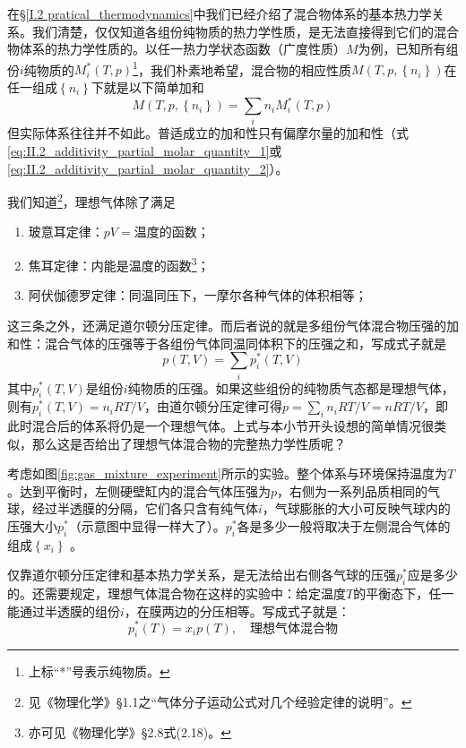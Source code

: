 \documentclass[main.tex]{subfiles}
\begin{document}
在\S\ref{I.2 pratical_thermodynamics}中我们已经介绍了混合物体系的基本热力学关系。我们清楚，仅仅知道各组份纯物质的热力学性质，是无法直接得到它们的混合物体系的热力学性质的。以任一热力学状态函数（广度性质）$M$为例，已知所有组份$i$纯物质的$M_i^*\left(T,p\right)$\footnote{上标“*”号表示纯物质。}，我们朴素地希望，混合物的相应性质$M\left(T,p,\left\{n_i\right\}\right)$在任一组成$\left\{n_i\right\}$下就是以下简单加和
\[M\left(T,p,\left\{n_i\right\}\right)=\sum_i n_i M_i^*\left(T,p\right)\]
但实际体系往往并不如此。普适成立的加和性只有偏摩尔量的加和性（式\eqref{eq:II.2_additivity_partial_molar_quantity_1}或\eqref{eq:II.2_additivity_partial_molar_quantity_2}）。

我们知道\footnote{见《物理化学》\S1.1之“气体分子运动公式对几个经验定律的说明”。}，理想气体除了满足
\begin{enumerate}
    \item 玻意耳定律：$pV=\text{温度的函数}$；
    \item 焦耳定律：内能是温度的函数\footnote{亦可见《物理化学》\S 2.8式(2.18)。}；
    \item 阿伏伽德罗定律：同温同压下，一摩尔各种气体的体积相等；
\end{enumerate}
这三条之外，还满足道尔顿分压定律。而后者说的就是多组份气体混合物压强的加和性：混合气体的压强等于各组份气体同温同体积下的压强之和，写成式子就是
\[p\left(T,V\right)=\sum_i p^*_i\left(T,V\right)\]
其中$p_i^*\left(T,V\right)$是组份$i$纯物质的压强。如果这些组份的纯物质气态都是理想气体，则有$p_i^*\left(T,V\right)=n_iRT/V$，由道尔顿分压定律可得$p=\sum_in_iRT/V=nRT/V$，即此时混合后的体系将仍是一个理想气体。上式与本小节开头设想的简单情况很类似，那么这是否给出了理想气体混合物的完整热力学性质呢？

考虑如图\ref{fig:gas_mixture_experiment}所示的实验。整个体系与环境保持温度为$T$。达到平衡时，左侧硬壁缸内的混合气体压强为$p$，右侧为一系列品质相同的气球，经过半透膜的分隔，它们各只含有纯气体$i$，气球膨胀的大小可反映气球内的压强大小$p^*_i$（示意图中显得一样大了）。$p^*_i$各是多少一般将取决于左侧混合气体的组成$\left\{x_i\right\}$ 。

仅靠道尔顿分压定律和基本热力学关系，是无法给出右侧各气球的压强$p^*_i$应是多少的。还需要规定，理想气体混合物在这样的实验中：给定温度$T$的平衡态下，任一能通过半透膜的组份$i$，在膜两边的分压相等。写成式子就是：
\begin{equation}
    \label{eq:II.3_ideal_gas_mixture_partial_pressure_rule}
    p^*_i\left(T\right)=x_ip\left(T\right),\quad\text{理想气体混合物}
\end{equation}
\end{document}
